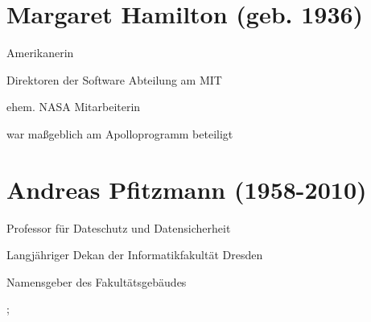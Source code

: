 \documentclass[a4paper,12pt]{report}
\begin{document}


\section*{Margaret Hamilton (geb. 1936)}
\begin{itemize*}
    \item Amerikanerin
    \item Direktoren der Software Abteilung am MIT
    \item ehem. NASA Mitarbeiterin
    \item war maßgeblich am Apolloprogramm beteiligt
\end{itemize*}

\section*{Andreas Pfitzmann (1958-2010)}
\begin{itemize*}
    \item Professor für Dateschutz und Datensicherheit
    \item Langjähriger Dekan der Informatikfakultät Dresden
    \item Namensgeber des Fakultätsgebäudes
\end{itemize*}

\pagebreak
    
    ;
\end{document}
